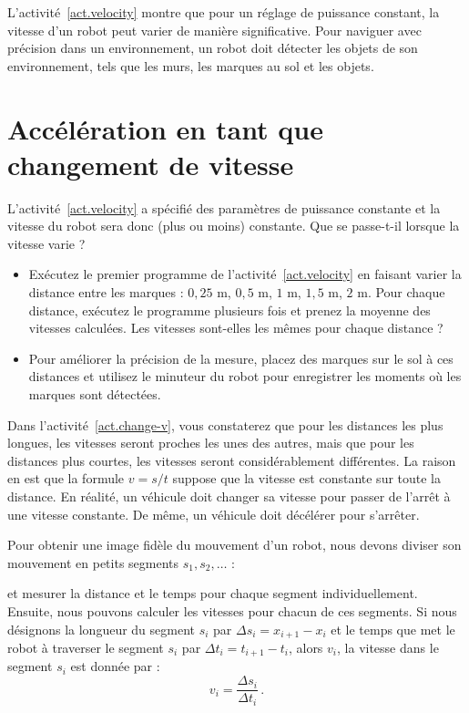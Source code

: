 L'activité~\ref{act.velocity} montre que pour un réglage de puissance constant, la vitesse d'un robot peut varier de manière significative. Pour naviguer avec précision dans un environnement, un robot doit détecter les objets de son environnement, tels que les murs, les marques au sol et les objets.

\section{Accélération en tant que changement de vitesse}\label{s.acceleration}

L'activité~\ref{act.velocity} a spécifié des paramètres de puissance constante et la vitesse du robot sera donc (plus ou moins) constante. Que se passe-t-il lorsque la vitesse varie ?


\begin{framed}
\begin{itemize}
\item Exécutez le premier programme de l'activité~\ref{act.velocity} en faisant varier la distance entre les marques : $0,25$ m, $0,5$ m, $1$ m, $1,5$ m, $2$ m. Pour chaque distance, exécutez le programme plusieurs fois et prenez la moyenne des vitesses calculées. Les vitesses sont-elles les mêmes pour chaque distance ?
\item Pour améliorer la précision de la mesure, placez des marques sur le sol à ces distances et utilisez le minuteur du robot pour enregistrer les moments où les marques sont détectées.
\end{itemize}
\end{framed}

Dans l'activité~\ref{act.change-v}, vous constaterez que pour les distances les plus longues, les vitesses seront proches les unes des autres, mais que pour les distances plus courtes, les vitesses seront considérablement différentes. La raison en est que la formule $v=s/t$ suppose que la vitesse est constante sur toute la distance. En réalité, un véhicule doit changer sa vitesse pour passer de l'arrêt à une vitesse constante. De même, un véhicule doit décélérer pour s'arrêter.

Pour obtenir une image fidèle du mouvement d'un robot, nous devons diviser son mouvement en petits segments $s_1,s_2,\ldots$ :
\begin{center}
\end{center}
et mesurer la distance et le temps pour chaque segment individuellement. Ensuite, nous pouvons calculer les vitesses pour chacun de ces segments. Si nous désignons la longueur du segment $s_i$ par $\Delta s_i = x_{i+1}-x_i$ et le temps que met le robot à traverser le segment $s_i$ par $\Delta t_i = t_{i+1}-t_i$, alors $v_i$, la vitesse dans le segment $s_i$ est donnée par :
\[v_i = \frac{\Delta s_i}{\Delta t_i}\,.\]

